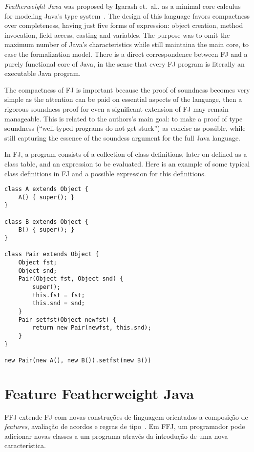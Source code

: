 \textit{Featherweight Java} was proposed by Igarash et.\ al., as a minimal core
calculus for modeling Java's type system~\cite{Igarashi99featherweightjava}. The 
design of this language favors compactness over completeness, having just five 
forms of expression: object creation, method invocation, field access, casting
and variables.
The purpose was to omit the maximum number of Java's characteristics while still
maintaina the main core, to ease the formalization model.
There is a direct correspondence between FJ and a purely functional core of
Java, in the sense that every FJ program is literally an executable Java
program.

The compactness of FJ is important because the proof of soundness becomes very
simple as the attention can be paid on essential aspects of the language, then
a rigorous soundness proof for even a significant extension of FJ may remain
manageable. This is related to the authors's main goal: to make a proof of type
soundness (``well-typed programs do not get stuck'') as concise as possible, while
still capturing the essence of the soundess argument for the full Java language.

In FJ, a program consists of a collection of class definitions, later on defined
as a class table, and an expression to be evaluated. Here is an example of some typical
class definitions in FJ and a possible expression for this definitions.

\begin{verbatim} 
class A extends Object {
    A() { super(); } 
} 

class B extends Object { 
    B() { super(); }
} 

class Pair extends Object { 
    Object fst; 
    Object snd;
    Pair(Object fst, Object snd) { 
        super(); 
        this.fst = fst; 
        this.snd = snd; 
    } 
    Pair setfst(Object newfst) { 
        return new Pair(newfst, this.snd); 
    } 
} 

new Pair(new A(), new B()).setfst(new B())

\end{verbatim}

    

\section{Feature Featherweight Java}

FFJ extende FJ com novas construções de linguagem orientados a composição de
\textit{features}\cite{fop}, avaliação de acordos e regras de
tipo~\cite{Apel08featurefeatherweight}. Em FFJ, um programador pode adicionar
novas classes a um programa através da introdução de uma nova característica.
    








